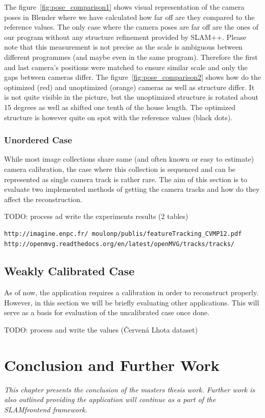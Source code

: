 The figure~\ref{fig:pose_comparison1} shows visual representation of the camera poses in Blender where we have calculated how far off are they compared to the reference values. The only case where the camera poses are far off are the ones of our program without any structure refinement provided by SLAM++. Please note that this measurement is not precise as the scale is ambiguous between different programmes (and maybe even in the same program). Therefore the first and last camera's positions were matched to ensure similar scale and only the gaps between cameras differ. The figure~\ref{fig:pose_comparison2} shows how do the optimized (red) and unoptimized (orange) cameras as well as structure differ. It is not quite visible in the picture, but the unoptimized structure is rotated about 15 degrees as well as shifted one tenth of the house length. The optimized structure is however quite on spot with the reference values (black dots).

\subsection*{Unordered Case}
While most image collections share same (and often known or easy to estimate) camera calibration, the case where this collection is sequenced and can be represented as single camera track is rather rare. The aim of this section is to evaluate two implemented methods of getting the camera tracks and how do they affect the reconstruction.

TODO:  process ad write the experiments results (2 tables)
\begin{verbatim}
http://imagine.enpc.fr/ moulonp/publis/featureTracking_CVMP12.pdf
http://openmvg.readthedocs.org/en/latest/openMVG/tracks/tracks/
\end{verbatim}
\section{Weakly Calibrated Case}
\label{sec:experiments-weakly}
As of now, the application requires a calibration in order to reconstruct properly. However, in this section we will be briefly evaluating other applications. This will serve as a basis for evaluation of the uncalibrated case once done.

TODO: process and write the values (Červená Lhota dataset)

\chapter{Conclusion and Further Work}
\label{chapter:conclusion}
\textit{This chapter presents the conclusion of the masters thesis work. Further work is also outlined providing the application will continue as a part of the SLAM\textunderscore frontend framework.}

